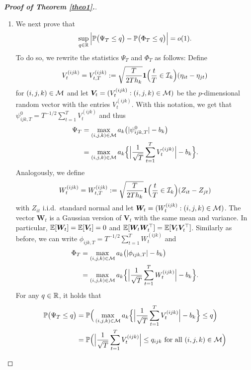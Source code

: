 \documentclass[a4paper,12pt]{article}
\numberwithin{equation}{section}
\begin{document}
\begin{proof}[\textnormal{\textbf{Proof of Theorem \ref{theo1}.}}]
\begin{enumerate}[label=\textit{Step \arabic*.}, leftmargin=0cm, itemindent=1.45cm]
\item We next prove that 
\begin{equation}\label{eq:kolmogorov-distance}
\sup_{q \in \mathbb{R}} \Big| \mathbb{P} \big( \Psi_T \le q \big) - \mathbb{P} \big( \Phi_T \le q \big) \Big| = o(1).
\end{equation}
To do so, we rewrite the statistics $\Psi_T$ and $\Phi_T$ as follows: Define 
\begin{equation*}
V^{(ijk)}_t = V^{(ijk)}_{t,T} := \sqrt{\frac{T}{2Th_k}} \boldsymbol{1}\Big(\frac{t}{T} \in \mathcal{I}_k\Big) (\eta_{it} - \eta_{jt})
\end{equation*}
for $(i,j,k) \in \mathcal{M}$ and let $\boldsymbol{V}_t = (V_t^{(ijk)}: (i,j,k) \in \mathcal{M})$ be the $p$-dimensional random vector with the entries $V_t^{(ijk)}$. With this notation, we get that $\psi_{ijk,T}^0 = T^{-1/2} \sum_{t=1}^T V^{(ijk)}_t$ and thus 
\begin{align*}
\Psi_T 
 & = \max_{(i,j,k) \in \mathcal{M}}  a_k \big( |\psi_{ijk,T}^0| - b_k \big) \\
 & = \max_{(i,j,k) \in \mathcal{M}} a_k \Big\{ \Big|\frac{1}{\sqrt{T}} \sum_{t=1}^T V^{(ijk)}_t\Big| - b_k \Big\}.
\end{align*} 
Analogously, we define 
\begin{equation*}
W^{(ijk)}_t = W^{(ijk)}_{t,T} := \sqrt{\frac{T}{2Th_k}} \boldsymbol{1}\Big(\frac{t}{T} \in \mathcal{I}_k\Big) (Z_{it} - Z_{jt})
\end{equation*}
with $Z_{it}$ i.i.d.\ standard normal and let $\boldsymbol{W}_t = (W_t^{(ijk)}: (i,j,k) \in \mathcal{M})$. The vector $\boldsymbol{W}_t$ is a Gaussian version of $\boldsymbol{V}_t$ with the same mean and variance. In particular, $\mathbb{E}[\boldsymbol{W}_t] = \mathbb{E}[\boldsymbol{V}_t] = 0$ and $\mathbb{E}[\boldsymbol{W}_t \boldsymbol{W}_t^\top] = \mathbb{E}[\boldsymbol{V}_t \boldsymbol{V}_t^\top]$. Similarly as before, we can write $\phi_{ijk,T} = T^{-1/2} \sum_{t=1}^T W^{(ijk)}_t$ and  
\begin{align*}
\Phi_T 
 & = \max_{(i,j,k) \in \mathcal{M}} a_k \big( |\phi_{ijk,T}| - b_k \big) \\
 & = \max_{(i,j,k) \in \mathcal{M}} a_k \Big\{ \Big|\frac{1}{\sqrt{T}} \sum_{t=1}^T W^{(ijk)}_t\Big| - b_k \Big\}.
\end{align*} 
For any $q \in \mathbb{R}$, it holds that
\begin{align*}
\pr \big( \Psi_T \le q \big) 
 & = \pr \Big( \max_{(i,j,k) \in \indexset} a_k \Big\{ \Big|\frac{1}{\sqrt{T}} \sum_{t=1}^T V^{(ijk)}_t\Big| - b_k \Big\} \le q \Big) \\
 & = \pr \Big( \Big|\frac{1}{\sqrt{T}} \sum_{t=1}^T V^{(ijk)}_t\Big| \le q_{ijk} \text{ for all } (i,j,k) \in \indexset \Big) \\

\end{align*}
\end{enumerate}
\end{proof}
\end{document}
